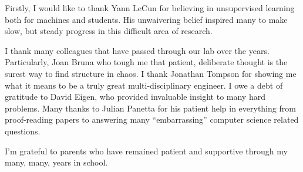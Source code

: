 Firstly, I would like to thank Yann LeCun for believing in unsupervised
learning both for machines and students. His unwaivering belief inspired many
to make slow, but steady progress in this difficult area of research.

I thank many colleagues that have passed through our lab over the years.
Particularly, Joan Bruna who tough me that patient, deliberate thought is the
surest way to find structure in chaos.  I thank Jonathan Tompson for showing me
what it means to be a truly great multi-disciplinary engineer.  I owe a debt of
gratitude to David Eigen, who provided invaluable insight to many hard
problems.  Many thanks to Julian Panetta for his patient help in everything
from proof-reading papers to answering many ``embarrassing'' computer science
related questions. 
      
I'm grateful to parents who have remained patient and supportive through my
many, many, years in school.  
